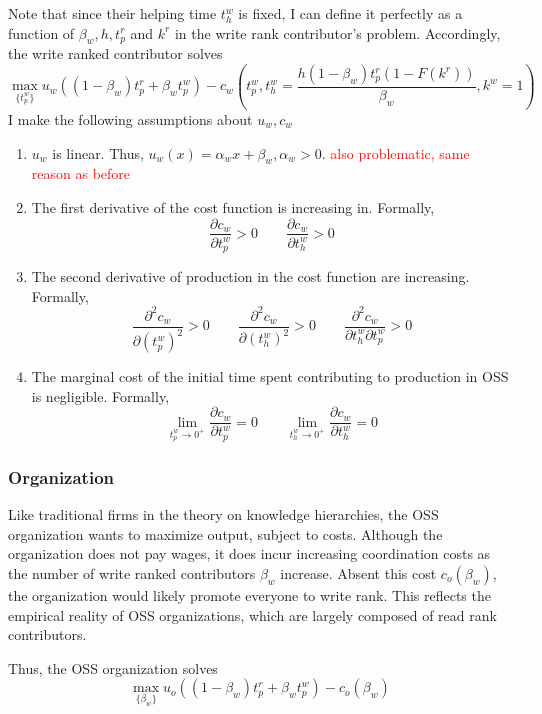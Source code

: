 \documentclass[source/paper/main.tex]{subfiles}
\begin{document}
\qquad Note that since their helping time $t_h^w$ is fixed, I can define it perfectly as a function of $\beta_w, h, t_p^r$ and $k^r$ in the write rank contributor's problem. Accordingly, the write ranked contributor solves
$$\max_{\{t_p^w\}} u_w\left((1-\beta_w) t_p^r + \beta_w t_p^w \right) - c_w\left(t_p^w, t_h^w = \frac{ h (1-\beta_w) t_p^r(1-F(k^r))}{\beta_w}, k^w = 1\right)$$
I make the following assumptions about $u_w, c_w$
\begin{enumerate}
    \item $u_w$ is linear. Thus, $u_w(x) = \alpha_wx + \beta_w, \alpha_w > 0$. 
    \textcolor{red}{also problematic, same reason as before}
    
    \item The first derivative of the cost function is increasing in. Formally, 
    $$\frac{\partial c_w}{\partial t_p^w}>0 \qquad \frac{\partial c_w}{\partial t_h^w}>0 $$   
    \item  The second derivative of production in the cost function are increasing. Formally, $$ \frac{\partial^2 c_w}{\partial (t_p^w)^2}>0 \qquad  \frac{\partial^2 c_w}{\partial (t_h^w)^2}>0 \qquad  \frac{\partial^2 c_w}{\partial t_h^w \partial t_p^w}>0$$
    \item The marginal cost of the initial time spent contributing to production in OSS is negligible. Formally,
    $$\lim_{t_p^w \to 0^+} \frac{\partial c_w}{\partial t_p^w} = 0 \qquad \lim_{t_h^w \to 0^+} \frac{\partial c_w}{\partial t_h^w} = 0$$
\end{enumerate}
\subsubsection{Organization}
Like traditional firms in the theory on knowledge hierarchies, the OSS organization wants to maximize output, subject to costs. Although the organization does not pay wages, it does incur increasing coordination costs as the number of write ranked contributors $\beta_w$ increase. Absent this cost $c_o(\beta_w)$, the organization would likely promote everyone to write rank. This reflects the empirical reality of OSS organizations, which are largely composed of read rank contributors. 

Thus, the OSS organization solves
$$\max_{\{\beta_w\}} u_o\left((1-\beta_w) t_p^r + \beta_w t_p^w\right) - c_o(\beta_w)$$ 
\end{document}
